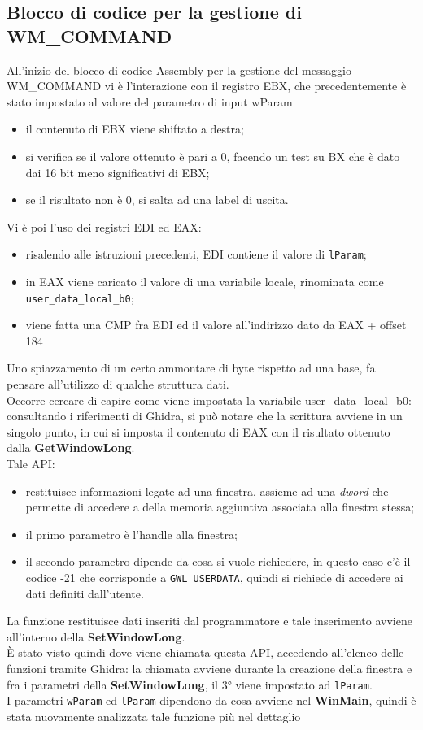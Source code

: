 \documentclass[12pt]{extarticle}
\begin{document}
\subsection{Blocco di codice per la gestione di WM\_COMMAND}
All'inizio del blocco di codice Assembly per la gestione del messaggio WM\_COMMAND vi è l'interazione con il registro EBX, che precedentemente è stato impostato al valore del parametro di input \textsf{wParam}
\begin{itemize}
\item il contenuto di EBX viene shiftato a destra; 
\item si verifica se il valore ottenuto è pari a 0, facendo un test su BX che è dato dai 16 bit meno significativi di EBX;
\item se il risultato non è 0, si salta ad una label di uscita. 
\end{itemize}
Vi è poi l'uso dei registri EDI ed EAX:
\begin{itemize}
\item risalendo alle istruzioni precedenti, EDI contiene il valore di \texttt{lParam};
\item in EAX viene caricato il valore di una variabile locale, rinominata come \texttt{user\_data\_local\_b0};
\item viene fatta una CMP fra EDI ed il valore all'indirizzo dato da EAX + offset 184
\end{itemize}
Uno spiazzamento di un certo ammontare di byte rispetto ad una base, fa pensare all'utilizzo di qualche struttura dati.\\Occorre cercare di capire come viene impostata la variabile \textsf{user\_data\_local\_b0}: consultando i riferimenti di Ghidra, si può notare che la scrittura avviene in un singolo punto, in cui si imposta il contenuto di EAX con il risultato ottenuto dalla \textbf{GetWindowLong}.\\Tale API:
\begin{itemize}
\item restituisce informazioni legate ad una finestra, assieme ad una \textit{dword} che permette di accedere a della memoria aggiuntiva associata alla finestra stessa;
\item il primo parametro è l'handle alla finestra;
\item il secondo parametro dipende da cosa si vuole richiedere, in questo caso c'è il codice -21 che corrisponde a \texttt{GWL\_USERDATA}, quindi si richiede di accedere ai dati definiti dall'utente.
\end{itemize}
La funzione restituisce dati inseriti dal programmatore e tale inserimento avviene all'interno della \textbf{SetWindowLong}.\\ È stato visto quindi dove viene chiamata questa API, accedendo all'elenco delle funzioni tramite Ghidra: la chiamata avviene durante la creazione della finestra e fra i parametri della \textbf{SetWindowLong}, il 3° viene impostato ad \texttt{lParam}.\\I parametri \texttt{wParam} ed \texttt{lParam} dipendono da cosa avviene nel \textbf{WinMain}, quindi è stata nuovamente analizzata tale funzione più nel dettaglio
\end{document}
